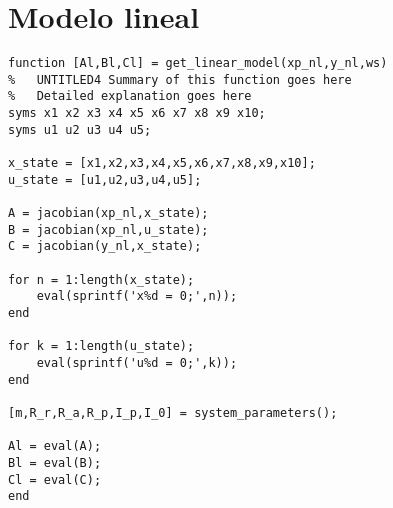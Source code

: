 \chapter{Modelo lineal}

\begin{lstlisting}[frame=single]
function [Al,Bl,Cl] = get_linear_model(xp_nl,y_nl,ws)
%	UNTITLED4 Summary of this function goes here
%   Detailed explanation goes here
syms x1 x2 x3 x4 x5 x6 x7 x8 x9 x10;
syms u1 u2 u3 u4 u5;

x_state = [x1,x2,x3,x4,x5,x6,x7,x8,x9,x10];
u_state = [u1,u2,u3,u4,u5];

A = jacobian(xp_nl,x_state);
B = jacobian(xp_nl,u_state);
C = jacobian(y_nl,x_state);

for n = 1:length(x_state);
    eval(sprintf('x%d = 0;',n));
end

for k = 1:length(u_state);
    eval(sprintf('u%d = 0;',k));
end

[m,R_r,R_a,R_p,I_p,I_0] = system_parameters();

Al = eval(A);
Bl = eval(B);
Cl = eval(C);
end

\end{lstlisting}
 